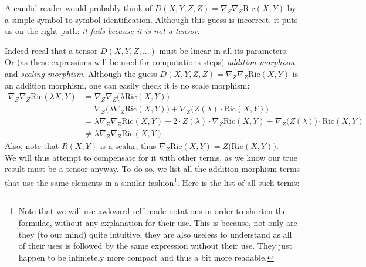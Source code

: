 \documentclass[a4paper,11pt]{article}
\numberwithin{equation}{section}
\theoremstyle{definition}
\newcommand{\R}{{\mathrm{Ric}}}
\begin{document}
A candid reader would probably think of $D(X,Y,Z,Z)=\nabla_Z \nabla_Z \R(X,Y)$ by a simple symbol-to-symbol identification. Although this guess is incorrect, it puts us on the right path: \emph{it fails because it is not a tensor}.

Indeed recal that a tensor $D(X,Y,Z,...)$ must be linear in all its parameters. Or (as these expressions will be used for computations steps) \emph{addition morphism} and \emph{scaling morphism}. Although the guess $D(X,Y,Z,Z)=\nabla_Z \nabla_Z \R(X,Y)$ is an addition morphism, one can easily check it is no scale morphism:
\begin{align*}
\nabla_Z \nabla_Z \R(\lambda X,Y)
    &=\nabla_Z \nabla_Z\big( \lambda \R(X,Y) \big)\\
    &= \nabla_Z \big(\lambda\nabla_Z \R(X,Y) \big)
    + \nabla_Z \big( Z(\lambda) \cdot \R(X,Y) \big)\\
    &= \lambda \nabla_Z \nabla_Z \R(X,Y)
    + 2 \cdot Z(\lambda) \cdot \nabla_Z \R(X,Y)
    + \nabla_Z \big( Z(\lambda)\big) \cdot \R(X,Y)\\
    &\ne \lambda \nabla_Z \nabla_Z \R(X,Y)
\end{align*}
Also, note that $R(X,Y)$ is a scalar, thus $\nabla_Z\R(X,Y)=Z\big(\R(X,Y)\big)$.\\

We will thus attempt to compensate for it with other terms, as we know our true result must be a tensor anyway. To do so, we list all the addition morphism terms that use the same elements in a similar fashion\footnote{Note that we will use awkward self-made notations in order to shorten the formulae, without any explanation for their use. This is because, not only are they (to our mind) quite intuitive, they are also useless to understand as all of their uses is followed by the same expression without their use. They just happen to be infinietely more compact and thus a bit more readable.}. Here is the list of all such terms:
\end{document}
